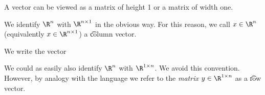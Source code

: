 
A vector can be viewed as a matrix of height 1 or a matrix of width one.

We identify $\R^{n}$ with $\R^{n \times 1}$ in the obvious way.
For this reason, we call $x \in \R^{n}$ (equivalently $x \in \R^{n \times 1}$) a \t{column vector}.

We write the vector

We could as easily also identify $\R^{n}$ with $\R^{1 \times n}$.
We avoid this convention.
However, by analogy with the language  we refer to the \textit{matrix} $y \in \R^{1 \times n}$ as a \t{row vector}.

\blankpage
